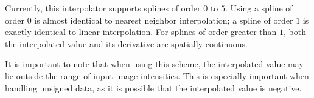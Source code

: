 Currently, this interpolator supports splines of order $0$ to $5$. Using a
spline of order $0$ is almost identical to nearest neighbor interpolation; a
spline of order $1$ is exactly identical to linear interpolation. For splines
of order greater than $1$, both the interpolated value and its derivative are
spatially continuous.

It is important to note that when using this scheme, the interpolated
value may lie outside the range of input image intensities. This is
especially important when handling unsigned data, as it is possible
that the interpolated value is negative.


